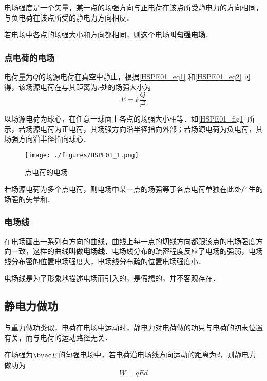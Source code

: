 电场强度是一个矢量，某一点的场强方向与正电荷在该点所受静电力的方向相同，与负电荷在该点所受的静电力方向相反．

若电场中各点的场强大小和方向都相同，则这个电场叫\textbf{匀强电场}．

\subsubsection{点电荷的电场}

电荷量为$Q$的场源电荷在真空中静止，根据\autoref{HSPE01_eq1} 和\autoref{HSPE01_eq2} 可得，该场源电荷在与其距离为$r$处的场强大小为
\begin{equation}
E=k\frac{Q}{r^2}
\end{equation}

以场源电荷为球心，在任意一球面上各点的场强大小相等．如\autoref{HSPE01_fig1} 所示，若场源电荷为正电荷，其场强方向沿半径指向外部；若场源电荷为负电荷，其场强方向沿半径指向球心．

\begin{figure}[ht]
\centering
\texttt{[image: ./figures/HSPE01\_1.png]}
\caption{点电荷的电场} \label{HSPE01_fig1}
\end{figure}

若场源电荷为多个点电荷，则电场中某一点的场强等于各点电荷单独在此处产生的场强的矢量和．

\subsubsection{电场线}

在电场画出一系列有方向的曲线，曲线上每一点的切线方向都跟该点的电场强度方向一致，这样的曲线叫做\textbf{电场线}．电场线分布的疏密程度反应了电场的强弱，电场线分布密的位置电场强度大，电场线分布疏的位置电场强度小．

电场线是为了形象地描述电场而引入的，是假想的，并不客观存在．

\subsection{静电力做功}

与重力做功类似，电荷在电场中运动时，静电力对电荷做的功只与电荷的初末位置有关，而与电荷的运动路径无关．

在场强为$\bvec E$的匀强电场中，若电荷沿电场线方向运动的距离为$d$，则静电力做功为
\begin{equation}\label{HSPE01_eq5}
W=qEd
\end{equation}

